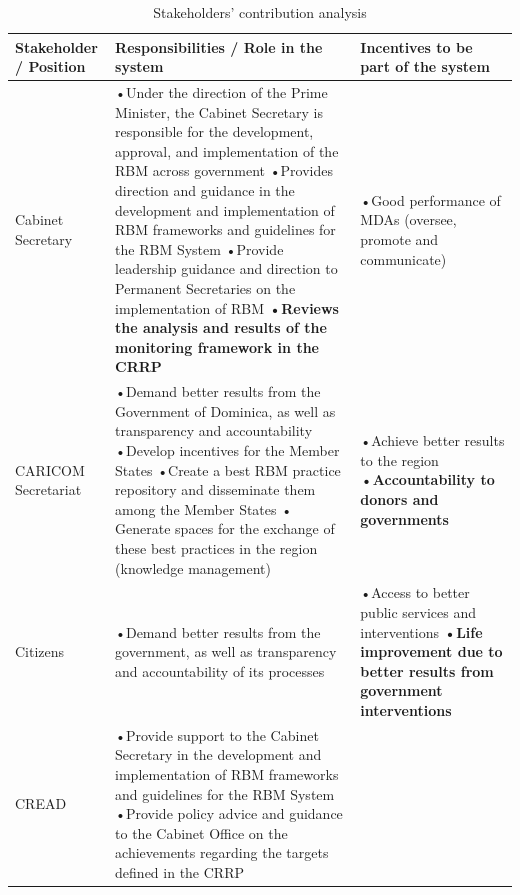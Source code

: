 \documentclass[
  10pt,
]{book}
\begin{document}
\begin{table}

\caption{\label{tab:unnamed-chunk-8}Stakeholders’ contribution analysis}
\centering
\fontsize{12}{14}\selectfont
\begin{tabu} to 
\hline
Stakeholder / Position & Responsibilities / Role in the system & Incentives to be part of the system\\
\hline
Cabinet Secretary & •Under the direction of the Prime Minister, the Cabinet Secretary is responsible for the development, approval, and implementation of the RBM across government 
•Provides direction and guidance in the development and implementation of RBM frameworks and guidelines for the RBM System 
•Provide leadership guidance and direction to Permanent Secretaries on the implementation of RBM
\textbf{•Reviews the analysis and results of the monitoring framework in the CRRP} & •Good performance of MDAs (oversee, promote and communicate)\\
\hline
CARICOM Secretariat & •Demand better results from the Government of Dominica, as well as transparency and accountability
•Develop incentives for the Member States
•Create a best RBM practice repository and disseminate them among the Member States 
• Generate spaces for the exchange of these best practices in the region (knowledge management) & •Achieve better results to the region
\textbf{•Accountability to donors and governments}\\
\hline
Citizens & •Demand better results from the government, as well as transparency and accountability of its processes & •Access to better public services and interventions
\textbf{•Life improvement due to better results from government interventions}\\
\hline
CREAD & •Provide support to the Cabinet Secretary in the development and implementation of RBM frameworks and guidelines for the RBM System
•Provide policy advice and guidance to the Cabinet Office on the achievements regarding the targets defined in the CRRP


\end{tabu}
\end{table}
\end{document}
